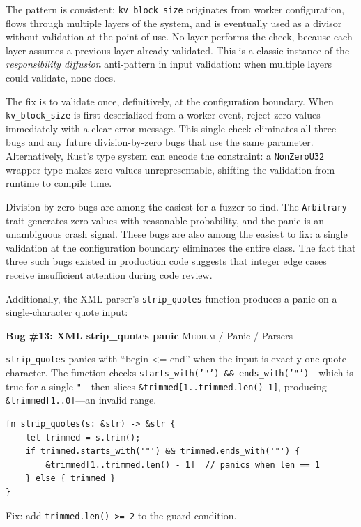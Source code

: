 The pattern is consistent: \texttt{kv\_block\_size} originates from worker configuration, flows through multiple layers of the system, and is eventually used as a divisor without validation at the point of use. No layer performs the check, because each layer assumes a previous layer already validated. This is a classic instance of the \emph{responsibility diffusion} anti-pattern in input validation: when multiple layers could validate, none does.

The fix is to validate once, definitively, at the configuration boundary. When \texttt{kv\_block\_size} is first deserialized from a worker event, reject zero values immediately with a clear error message. This single check eliminates all three bugs and any future division-by-zero bugs that use the same parameter. Alternatively, Rust's type system can encode the constraint: a \texttt{NonZeroU32} wrapper type makes zero values unrepresentable, shifting the validation from runtime to compile time.

\begin{insightbox}
Division-by-zero bugs are among the easiest for a fuzzer to find. The \texttt{Arbitrary} trait generates zero values with reasonable probability, and the panic is an unambiguous crash signal. These bugs are also among the easiest to fix: a single validation at the configuration boundary eliminates the entire class. The fact that three such bugs existed in production code suggests that integer edge cases receive insufficient attention during code review.
\end{insightbox}

Additionally, the XML parser's \texttt{strip\_quotes} function produces a panic on a single-character quote input:

\begin{bugbox}
\textbf{Bug \#13: XML strip\_quotes panic} \hfill \textsc{Medium} / Panic / Parsers

\texttt{strip\_quotes} panics with ``begin <= end'' when the input is exactly one quote character. The function checks \texttt{starts\_with('"') \&\& ends\_with('"')}---which is true for a single \texttt{"}---then slices \texttt{\&trimmed[1..trimmed.len()-1]}, producing \texttt{\&trimmed[1..0]}---an invalid range.
\begin{verbatim}
fn strip_quotes(s: &str) -> &str {
    let trimmed = s.trim();
    if trimmed.starts_with('"') && trimmed.ends_with('"') {
        &trimmed[1..trimmed.len() - 1]  // panics when len == 1
    } else { trimmed }
}
\end{verbatim}
Fix: add \texttt{trimmed.len() >= 2} to the guard condition.
\end{bugbox}

